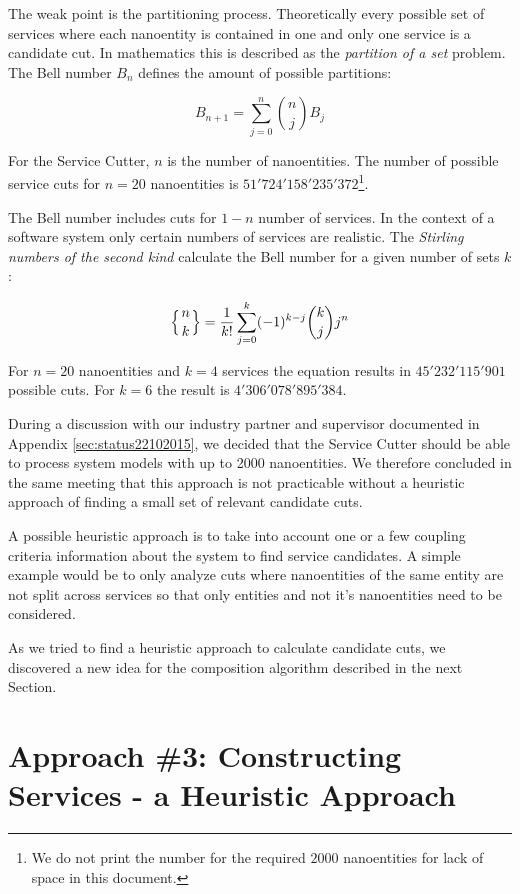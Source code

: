 The weak point is the partitioning process. Theoretically every possible set of services where each nanoentity is contained in one and only one service is a candidate cut. In mathematics this is described as the \textit{partition of a set}\cite{partitionOfASet} problem. The Bell number $B_n$ defines the amount of possible partitions: 


\begin{displaymath}
B_{n+1}=\sum_{j=0}^n {n\choose j} B_j
\end{displaymath}

For the Service Cutter, $n$ is the number of nanoentities. The number of possible service cuts for $n=20$ nanoentities is $51'724'158'235'372$\footnote{We do not print the number for the required $2000$ nanoentities for lack of space in this document.}.

The Bell number includes cuts for $1 - n$ number of services. In the context of a software system only certain numbers of services are realistic. The \textit{Stirling numbers of the second kind} calculate the Bell number for a given number of sets $k$:

\begin{displaymath}
\left\{ {n \atop k}\right\} = \frac{1}{k!}\sum_{j=0}^{k} (-1)^{k-j} \binom{k}{j} j^n
\end{displaymath}

For $n=20$ nanoentities and $k=4$ services the equation results in $45'232'115'901$ possible cuts. For $k=6$ the result is $4'306'078'895'384$.

During a discussion with our industry partner and supervisor documented in Appendix \ref{sec:status22102015}, we decided that the Service Cutter should be able to process system models with up to 2000 nanoentities. We therefore concluded in the same meeting that this approach is not practicable without a heuristic approach of finding a small set of relevant candidate cuts. 

A possible heuristic approach is to take into account one or a few coupling criteria information about the system to find service candidates. A simple example would be to only analyze cuts where nanoentities of the same entity are not split across services so that only entities and not it's nanoentities need to be considered.

As we tried to find a heuristic approach to calculate candidate cuts, we discovered a new idea for the composition algorithm described in the next Section. 

\section{Approach \#3: Constructing Services - a Heuristic Approach}

